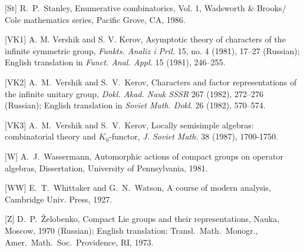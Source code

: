 \item{[St]} {\smc R.~P.~Stanley,} Enumerative combinatorics, Vol. 1,
Wadsworth \& Brooks/ Cole  mathematics series, Pacific Grove, CA, 1986.
\item{[VK1]} {\smc A. M. Vershik and S. V. Kerov,}  
Asymptotic theory of 
characters of the infinite symmetric group,  
{\it Funkts. Analiz i Pril.\/} 15, no. 
4 (1981), 17--27 (Russian); English translation in {\it Funct. Anal. 
Appl.\/} 15 (1981), 246--255. 
\item{[VK2]} {\smc A.~M.~Vershik and S.~V.~Kerov,}  
Characters and factor representations of the infinite unitary group,  
{\it Dokl. Akad. Nauk SSSR\/} 267 (1982), 272--276 (Russian);  
English translation in {\it Soviet Math. Dokl.\/} 26 
(1982), 570--574. 
\item{[VK3]} {\smc A.~M.~Vershik and S.~V.~Kerov,} 
Locally semisimple algebras: combinatorial theory and $K_0$-functor, 
{\it J. Soviet Math.\/} 38 (1987), 1700-1750. 
\item{[W]} {\smc A.~J.~Wassermann,} Automorphic actions of compact groups
on operator algebras, Dissertation, University of Pennsylvania, 1981.
\item{[WW]} {\smc E.~T.~Whittaker and G.~N.~Watson,} A course of modern
analysis, Cambridge Univ. Press, 1927.
\item{[Z]} {\smc D.~P.~\v{Z}elobenko,} Compact Lie groups and their
representations, Nauka, Moscow, 1970 (Russian); English translation: 
Transl.\ Math.\ Monogr., Amer.\ Math.\ Soc.\ Providence, RI, 1973.

\bye



